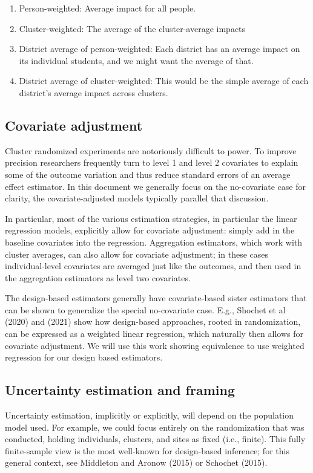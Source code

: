 \documentclass[12pt]{article}
\begin{document}
\begin{enumerate}
	\item Person-weighted: Average impact for all people.
	\item Cluster-weighted: The average of the cluster-average impacts
	\item District average of person-weighted: Each district has an average impact on its individual students, and we might want the average of that.
	\item District average of cluster-weighted: This would be the simple average of each district's average impact across clusters.
\end{enumerate}




\subsection{Covariate adjustment}\label{covariate-adjustment}

Cluster randomized experiments are notoriously difficult to power. To
improve precision researchers frequently turn to level 1 and level 2
covariates to explain some of the outcome variation and thus reduce
standard errors of an average effect estimator.
In this document we generally focus on the no-covariate case for clarity, the covariate-adjusted models typically parallel that discussion.

In particular, most of the various estimation strategies, in particular the linear
regression models, explicitly allow for covariate adjustment: simply add in the baseline covariates into the regression.
Aggregation estimators, which work with cluster averages, can also allow for covariate adjustment; in these cases individual-level covariates are averaged just like the outcomes, and then used in the aggregation estimators as level two covariates.

The design-based estimators generally have covariate-based sister estimators that can
be shown to generalize the special no-covariate case. E.g., Shochet et
al (2020) and (2021) show how design-based approaches, rooted in
randomization, can be expressed as a weighted linear regression, which
naturally then allows for covariate adjustment.
We will use this work showing equivalence to use weighted regression for our design based estimators.



\subsection{Uncertainty estimation and framing}
Uncertainty estimation, implicitly or explicitly, will depend on the population model used.
For example, we could focus entirely on the randomization that was conducted, holding individuals, clusters, and sites as fixed (i.e., finite).
This fully finite-sample view is the most well-known for design-based inference; for this general context, see Middleton and Aronow (2015) or Schochet (2015).
\end{document}
